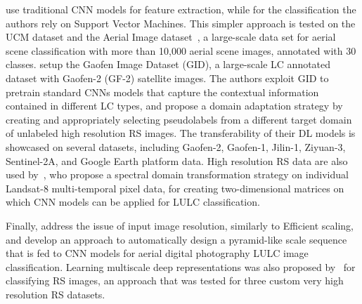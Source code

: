 \documentclass[journal]{IEEEtran}
\begin{document}
\cite{chaib2017deep} use traditional CNN models for feature extraction, while for the classification the authors rely on Support Vector Machines. This simpler approach is tested on the UCM dataset and the Aerial Image dataset~\citep{7907303}, a large-scale data set for aerial scene classification with more than 10,000 aerial scene images, annotated with 30 classes. \cite{TONG2020111322} setup the Gaofen Image Dataset (GID), a large-scale LC annotated dataset with Gaofen-2 (GF-2) satellite images. The authors exploit GID to pretrain standard CNNs models that capture the contextual information contained in different LC types, and propose a domain adaptation strategy by creating and appropriately selecting pseudolabels from a different target domain of unlabeled high resolution RS images. The transferability of their DL models is showcased on several datasets, including Gaofen-2, Gaofen-1, Jilin-1, Ziyuan-3, Sentinel-2A, and Google Earth platform data. High resolution RS data are also used by~\cite{lee2020different}, who propose a spectral domain transformation strategy on individual Landsat-8 multi-temporal pixel data, for creating two-dimensional matrices on which CNN models can be applied for LULC classification.  

Finally, \cite{zhang2020scale} address the issue of input image resolution, similarly to Efficient scaling, and develop an approach to automatically design a pyramid-like scale sequence that is fed to CNN models for aerial digital photography LULC image classification. Learning multiscale deep representations was also proposed by~\cite{zhao2016learning} for classifying RS images, an approach that was tested for three custom very high resolution RS datasets. 
\end{document}
